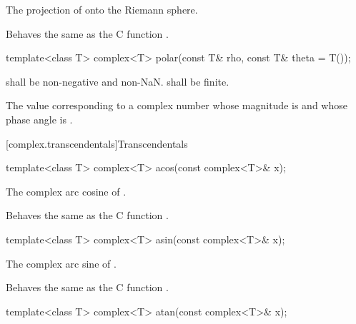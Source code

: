 \begin{itemdescr}
\pnum
\returns The projection of  onto the Riemann sphere.

\pnum
\remarks
Behaves the same as the C function .
\end{itemdescr}

%
\begin{itemdecl}
template<class T> complex<T> polar(const T& rho, const T& theta = T());
\end{itemdecl}

\begin{itemdescr}
\pnum
\requires
{} shall be non-negative and non-NaN\@.  shall be finite.

\pnum
\returns
The
value corresponding
to a complex number whose magnitude is  and whose phase angle
is .
\end{itemdescr}

[complex.transcendentals]{Transcendentals}

%
%
\begin{itemdecl}
template<class T> complex<T> acos(const complex<T>& x);
\end{itemdecl}

\begin{itemdescr}
\pnum
\returns The complex arc cosine of .

\pnum
\remarks
Behaves the same as the C function .
\end{itemdescr}

%
%
\begin{itemdecl}
template<class T> complex<T> asin(const complex<T>& x);
\end{itemdecl}

\begin{itemdescr}
\pnum
\returns The complex arc sine of .

\pnum
\remarks
Behaves the same as the C function .
\end{itemdescr}

%
%
\begin{itemdecl}
template<class T> complex<T> atan(const complex<T>& x);
\end{itemdecl}

